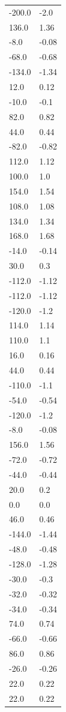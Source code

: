 \begin{longtable}{ll}
-200.0 & -2.0 \\
136.0 & 1.36 \\
-8.0 & -0.08 \\
-68.0 & -0.68 \\
-134.0 & -1.34 \\
12.0 & 0.12 \\
-10.0 & -0.1 \\
82.0 & 0.82 \\
44.0 & 0.44 \\
-82.0 & -0.82 \\
112.0 & 1.12 \\
100.0 & 1.0 \\
154.0 & 1.54 \\
108.0 & 1.08 \\
134.0 & 1.34 \\
168.0 & 1.68 \\
-14.0 & -0.14 \\
30.0 & 0.3 \\
-112.0 & -1.12 \\
-112.0 & -1.12 \\
-120.0 & -1.2 \\
114.0 & 1.14 \\
110.0 & 1.1 \\
16.0 & 0.16 \\
44.0 & 0.44 \\
-110.0 & -1.1 \\
-54.0 & -0.54 \\
-120.0 & -1.2 \\
-8.0 & -0.08 \\
156.0 & 1.56 \\
-72.0 & -0.72 \\
-44.0 & -0.44 \\
20.0 & 0.2 \\
0.0 & 0.0 \\
46.0 & 0.46 \\
-144.0 & -1.44 \\
-48.0 & -0.48 \\
-128.0 & -1.28 \\
-30.0 & -0.3 \\
-32.0 & -0.32 \\
-34.0 & -0.34 \\
74.0 & 0.74 \\
-66.0 & -0.66 \\
86.0 & 0.86 \\
-26.0 & -0.26 \\
22.0 & 0.22 \\
22.0 & 0.22 \\

\end{longtable}
